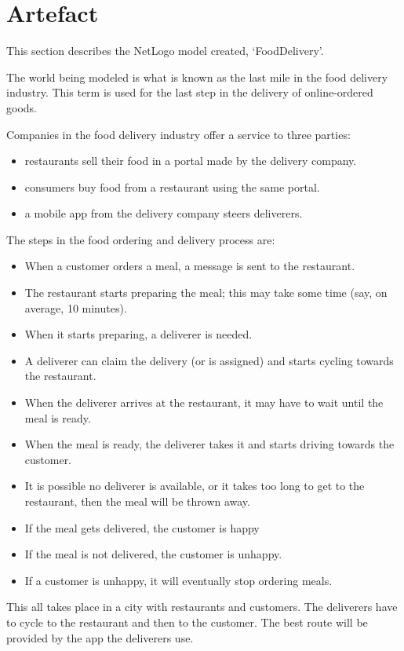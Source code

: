 \section{Artefact}\label{sec:artefact}
This section describes the NetLogo model created, `FoodDelivery'.

The world being modeled is what is known as the last mile in the food delivery industry.
This term is used for the last step in the delivery of online-ordered goods.

Companies in the food delivery industry offer a service to three parties:
\begin{itemize}
    \item restaurants sell their food in a portal made by the delivery company.
    \item consumers buy food from a restaurant using the same portal.
    \item a mobile app from the delivery company steers deliverers.
\end{itemize}

The steps in the food ordering and delivery process are:
\begin{itemize}
    \item When a customer orders a meal, a message is sent to the restaurant.
    \item The restaurant starts preparing the meal; this may take some time (say, on average, 10 minutes).
    \item When it starts preparing, a deliverer is needed.
    \item A deliverer can claim the delivery (or is assigned) and starts cycling towards the restaurant.
    \item When the deliverer arrives at the restaurant, it may have to wait until the meal is ready.
    \item When the meal is ready, the deliverer takes it and starts driving towards the customer.
    \item It is possible no deliverer is available, or it takes too long to get to the restaurant,
then the meal will be thrown away.
    \item If the meal gets delivered, the customer is happy
    \item If the meal is not delivered, the customer is unhappy.
    \item If a customer is unhappy, it will eventually stop ordering meals.
\end{itemize}

This all takes place in a city with restaurants and customers.
The deliverers have to cycle to the restaurant and then to the customer.
The best route will be provided by the app the deliverers use.

